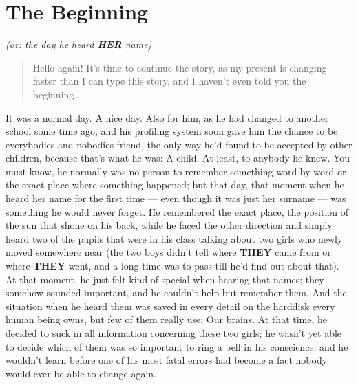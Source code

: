 \chapter{The Beginning}
\label{cha:the-beginning}
\emph{(or: the day he heard \textbf{HER} name)}\\
\begin{verse}
Hello again!
It's time to continue the story, as my present is changing faster than I can type this story, and I haven't even told you the beginning\ldots
\end{verse}

It was a normal day. A nice day. Also for him, as he had changed to another school some time ago, and his profiling system soon gave him the chance to be everybodies and nobodies friend, the only way he'd found to be accepted by other children, because that's what he was: A child. At least, to anybody he knew. You must know, he normally was no person to remember something word by word or the exact place where something happened; but that day, that moment when he heard her name for the first time --- even though it was just her surname --- was something he would never forget. He remembered the exact place, the position of the sun that shone on his back, while he faced the other direction and simply heard two of the pupils that were in his class talking about two girls who newly moved somewhere near (the two boys didn't tell where \textbf{THEY} came from or where \textbf{THEY} went, and a long time was to pass till he'd find out about that). At that moment, he just felt kind of special when hearing that names; they somehow sounded important, and he couldn't help but remember them. And the situation when he heard them was saved in every detail on the harddisk every human being owns, but few of them really use: Our brains. At that time, he decided to suck in all information concerning these two girls; he wasn't yet able to decide which of them was so important to ring a bell in his conscience, and he wouldn't learn before one of his most fatal errors had become a fact nobody would ever be able to change again.

